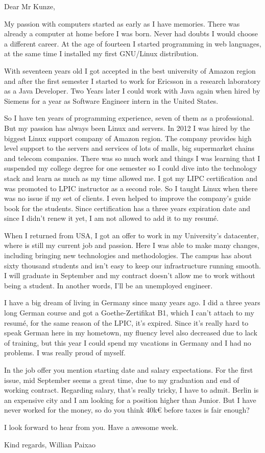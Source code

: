 \documentclass{letter}
\begin{document}
Dear Mr Kunze,

My passion with computers started as early as I have memories. There was already
a computer at home before I was born. Never had doubts I would choose a
different career. At the age of fourteen I started programming in web languages,
at the same time I installed my first GNU/Linux distribution.

With seventeen years old I got accepted in the best university of Amazon region
and after the first semester I started to work for Ericsson in a research
laboratory as a Java Developer. Two Years later I could work with Java again
when hired by Siemens for a year as Software Engineer intern in the United
States.

So I have ten years of programming experience, seven of them as a professional.
But my passion has always been Linux and servers. In 2012 I was hired by the
biggest Linux support company of Amazon region. The company provides high level
support to the servers and services of lots of malls, big supermarket chains and
telecom companies. There was so much work and things I was learning that I
suspended my college degree for one semester so I could dive into the technology
stack and learn as much as my time allowed me. I got my LIPC certification and
was promoted to LPIC instructor as a second role. So I taught Linux when there
was no issue if my set of clients. I even helped to improve the company's guide
book for the students. Since certification has a three years expiration date and
since I didn't renew it yet, I am not allowed to add it to my resumé.

When I returned from USA, I got an offer to work in my University's datacenter,
where is still my current job and passion. Here I was able to make many changes,
including bringing new technologies and methodologies. The campus has about
sixty thousand students and isn't easy to keep our infrastructure running
smooth. I will graduate in September and my contract doesn't allow me to work
without being a student. In another words, I'll be an unemployed engineer.

I have a big dream of living in Germany since many years ago. I did a three
years long German course and got a Goethe-Zertifikat B1, which I can't attach to
my resumé, for the same reason of the LPIC, it's expired. Since it's really hard
to speak German here in my hometown, my fluency level also decreased due to lack
of training, but this year I could spend my vacations in Germany and I had no
problems. I was really proud of myself.

In the job offer you mention starting date and salary expectations. For the
first issue, mid September seems a great time, due to my graduation and end of
working contract. Regarding salary, that's really tricky, I have to admit.
Berlin is an expensive city and I am looking for a position higher than Junior.
But I have never worked for the money, so do you think 40k€ before taxes is fair
enough?

I look forward to hear from you. Have a awesome week.

Kind regards,
Willian Paixao
\end{document}
